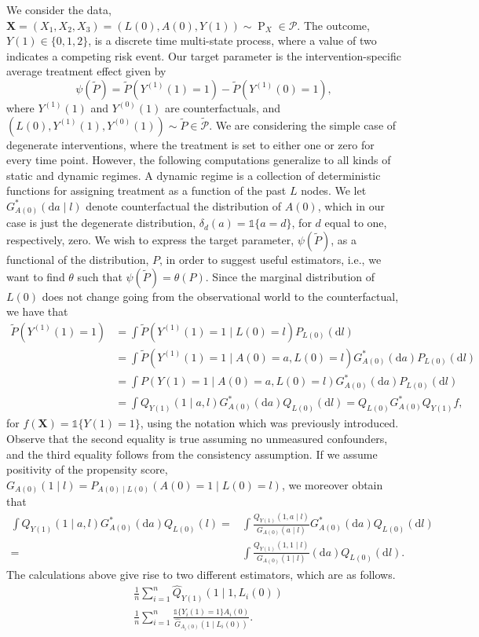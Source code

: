 \documentclass{article}
\newcommand{\A}{A}
\renewcommand{\L}{L}
\newcommand{\Y}{Y}
\newcommand{\Ystar}[2]{Y^{(#1)}(#2)}
\newcommand{\Asubs}[2]{A_{#1}(#2)}
\newcommand{\Lsubs}[2]{L_{#1}(#2)}
\newcommand{\Ysubs}[2]{Y_{#1}(#2)}
\newcommand{\distx}{\ensuremath{\P_{X}}}
\renewcommand{\P}{\ensuremath{\operatorname{P}}}
\renewcommand{\d}{\ensuremath{\mathrm{d}}}
\begin{document}
We consider the data, $\textbf{X}=(X_1,X_2,X_3)=(\L(0),\A(0),\Y(1))\sim \distx\in\mathcal{P}$. 
The outcome, $Y(1)\in\{0,1,2\}$, is a discrete
time multi-state process, where a value of two indicates a competing
risk event.
Our target parameter is the intervention-specific average
treatment effect given by
$$\psi(\tilde{P})=\tilde{P}(\Ystar{1}{1}=1)-\tilde{P}(\Ystar{1}{0}=1),$$
where $\Ystar{1}{1}$ and $\Ystar{0}{1}$ are counterfactuals, and $(\L(0),\Ystar{1}{1},\Ystar{0}{1})\sim\tilde{P}\in\tilde{\mathcal{P}}$. We are considering the simple case of degenerate interventions, where the treatment is set to either one or zero for every time point. However, the following computations generalize to all kinds of static and \d ynamic regimes. A \d ynamic regime is a collection of deterministic functions for assigning treatment as a function of the past $L$ nodes. We let $G^*_{\A(0)}(\d a\mid l)$ denote counterfactual the distribution of $\A(0)$, which in our case is just the degenerate distribution, $\delta_d(a)=\mathds{1}\{a=d\}$, for $d$ equal to one, respectively, zero. We wish to express the target parameter, $\psi(\tilde{P})$, as a functional of the distribution, $P$, in order to suggest useful estimators, i.e., we want to find $\theta$ such that $\psi(\tilde{P})=\theta(P)$. Since the marginal distribution of $\L(0)$ does not change going from the observational world to the counterfactual, we have that
\begin{align*}
    \tilde{P}(\Ystar{1}{1}=1)&=\int\tilde{P}(\Ystar{1}{1}=1\mid \L(0)=l)P_{\L(0)}(\d l)\\
    &=\int\tilde{P}(\Ystar{1}{1}=1\mid \A(0)=a,\L(0)=l)G^*_{\A(0)}(\d a)P_{\L(0)}(\d l)\\
    &=\int P(\Y(1)=1\mid \A(0)=a,\L(0)=l)G^*_{\A(0)}(\d a)P_{\L(0)}(\d l)\\
    &=\int Q_{\Y(1)}(1\mid a,l)G^*_{\A(0)}(\d a)Q_{\L(0)}(\d l)=Q_{\L(0)}G^*_{\A(0)}Q_{\Y(1)}f,
\end{align*}
for $f(\textbf{X})=\mathds{1}\{\Y(1)=1\}$, using the notation which
was previously introduced. Observe that the second equality is true
assuming no unmeasured confounders, and the third equality follows
from the consistency assumption. If we assume positivity of the
propensity score,
$G_{\A(0)}(1\mid l)=P_{\A(0)\mid \L(0)}(\A(0)=1\mid \L(0)=l)$, we
moreover obtain that
\begin{align*}
    \int Q_{\Y(1)}(1\mid a,l)G^*_{\A(0)}(\d a)Q_{\L(0)}(l)=&\int\frac{Q_{\Y(1)}(1,a\mid l)}{G_{\A(0)}(a\mid l)}G^*_{\A(0)}(\d a)Q_{\L(0)}(\d l)\\
    =&\int\frac{Q_{\Y(1)}(1,1\mid l)}{G_{\A(0)}(1\mid l)}(\d a)Q_{\L(0)}(\d l).
\end{align*}
The calculations above give rise to two different estimators, which are as follows.
\begin{align*}
    &\frac{1}{n}\sum_{i=1}^n\hat{Q}_{\Y(1)}(1\mid 1,\Lsubs{i}{0})\tag{G-formula}\\
    &\frac{1}{n}\sum_{i=1}^n\frac{\mathds{1}\{\Ysubs{i}{1}=1\}\Asubs{i}{0}}{\hat{G}_{\Asubs{i}{0}}(1\mid \Lsubs{i}{0})}.\tag{IPTW}
\end{align*}
\end{document}
